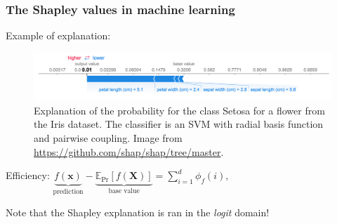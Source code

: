 \documentclass{beamer}
\begin{document}
\begin{frame}
  \frametitle{The Shapley values in machine learning}
  Example of explanation:
  \begin{figure}
    \centering
    \includegraphics[width=\linewidth]{figures/example_from_shap}
    \caption{Explanation of the probability for the class Setosa for a flower from the Iris dataset. The classifier is an SVM with radial basis function and pairwise coupling. {\tiny Image from \url{https://github.com/shap/shap/tree/master}.}}
  \end{figure}

  Efficiency: $\underbrace{f(\bm{x})}_{\text{prediction}}-\underbrace{\mathbb{E}_{\text{Pr}}[f(\bm{X})]}_{\text{base value}} = \sum_{i=1}^{d} \phi_f(i),$
  \vspace{1cm}
  
  Note that the Shapley explanation is ran in the \emph{logit} domain!
  
\end{frame}
\end{document}
